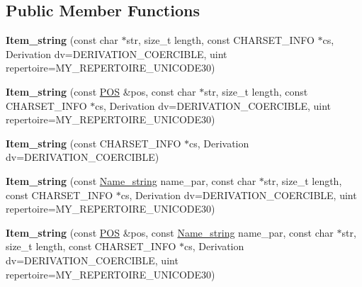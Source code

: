 \subsection*{Public Member Functions}
\begin{DoxyCompactItemize}
\item 
\mbox{\label{classItem__string_a101c072524f73ffb3e09afa8188e13ad}} 
{\bfseries Item\+\_\+string} (const char $\ast$str, size\+\_\+t length, const C\+H\+A\+R\+S\+E\+T\+\_\+\+I\+N\+FO $\ast$cs, Derivation dv=D\+E\+R\+I\+V\+A\+T\+I\+O\+N\+\_\+\+C\+O\+E\+R\+C\+I\+B\+LE, uint repertoire=M\+Y\+\_\+\+R\+E\+P\+E\+R\+T\+O\+I\+R\+E\+\_\+\+U\+N\+I\+C\+O\+D\+E30)
\item 
\mbox{\label{classItem__string_a048ae679d7ae03857a308f6bc1a9d922}} 
{\bfseries Item\+\_\+string} (const \mbox{\hyperlink{structYYLTYPE}{P\+OS}} \&pos, const char $\ast$str, size\+\_\+t length, const C\+H\+A\+R\+S\+E\+T\+\_\+\+I\+N\+FO $\ast$cs, Derivation dv=D\+E\+R\+I\+V\+A\+T\+I\+O\+N\+\_\+\+C\+O\+E\+R\+C\+I\+B\+LE, uint repertoire=M\+Y\+\_\+\+R\+E\+P\+E\+R\+T\+O\+I\+R\+E\+\_\+\+U\+N\+I\+C\+O\+D\+E30)
\item 
\mbox{\label{classItem__string_a26a7316d05a8bc2b499d1e03c6d243a2}} 
{\bfseries Item\+\_\+string} (const C\+H\+A\+R\+S\+E\+T\+\_\+\+I\+N\+FO $\ast$cs, Derivation dv=D\+E\+R\+I\+V\+A\+T\+I\+O\+N\+\_\+\+C\+O\+E\+R\+C\+I\+B\+LE)
\item 
\mbox{\label{classItem__string_a8e98676c5bb5bf10c5b844468650c1e3}} 
{\bfseries Item\+\_\+string} (const \mbox{\hyperlink{className__string}{Name\+\_\+string}} name\+\_\+par, const char $\ast$str, size\+\_\+t length, const C\+H\+A\+R\+S\+E\+T\+\_\+\+I\+N\+FO $\ast$cs, Derivation dv=D\+E\+R\+I\+V\+A\+T\+I\+O\+N\+\_\+\+C\+O\+E\+R\+C\+I\+B\+LE, uint repertoire=M\+Y\+\_\+\+R\+E\+P\+E\+R\+T\+O\+I\+R\+E\+\_\+\+U\+N\+I\+C\+O\+D\+E30)
\item 
\mbox{\label{classItem__string_aafe6d5281958199797d720f7e208fc2b}} 
{\bfseries Item\+\_\+string} (const \mbox{\hyperlink{structYYLTYPE}{P\+OS}} \&pos, const \mbox{\hyperlink{className__string}{Name\+\_\+string}} name\+\_\+par, const char $\ast$str, size\+\_\+t length, const C\+H\+A\+R\+S\+E\+T\+\_\+\+I\+N\+FO $\ast$cs, Derivation dv=D\+E\+R\+I\+V\+A\+T\+I\+O\+N\+\_\+\+C\+O\+E\+R\+C\+I\+B\+LE, uint repertoire=M\+Y\+\_\+\+R\+E\+P\+E\+R\+T\+O\+I\+R\+E\+\_\+\+U\+N\+I\+C\+O\+D\+E30)

\end{DoxyCompactItemize}
